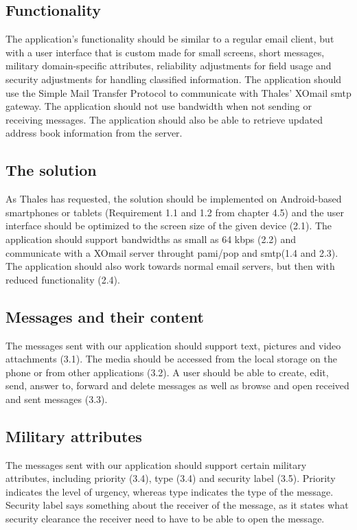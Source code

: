\subsection{Functionality}
The application's functionality should be similar to a regular email client, but with a user interface that is custom made for small screens, short messages, military domain-specific attributes, reliability adjustments for field usage and security adjustments for handling classified information. The application should use the Simple Mail Transfer Protocol to communicate with Thales' XOmail \gls{smtp} gateway.
\newline
\newline
The application should not use bandwidth when not sending or receiving messages. The application should also be able to retrieve updated address book information from the server.

\subsection{The solution}
As Thales has requested, the solution should be implemented on Android-based smartphones or tablets (Requirement 1.1 and 1.2 from chapter 4.5) and the user interface should be optimized to the screen size of the given device (2.1). The application should support bandwidths as small as 64 kbps (2.2) and communicate with a XOmail server throught \gls{pami}/\gls{pop} and \gls{smtp}(1.4 and 2.3). The application should also work towards normal email servers, but then with reduced functionality (2.4).

\subsection{Messages and their content}
The messages sent with our application should support text, pictures and video attachments (3.1). The media should be accessed from the local storage on the phone or from other applications (3.2). A user should be able to create, edit, send, answer to, forward and delete messages as well as browse and open received and sent messages (3.3).

\subsection{Military attributes}
The messages sent with our application should support certain military attributes, including priority (3.4), type (3.4) and security label (3.5). Priority indicates the level of urgency, whereas type indicates the type of the message. Security label says something about the receiver of the message, as it states what security clearance the receiver need to have to be able to open the message.

